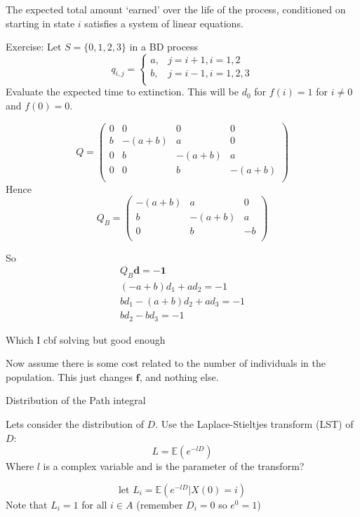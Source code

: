 \documentclass{/home/janmebows/Documents/LatexTemplates/myassignment}
\begin{document}
The expected total amount `earned' over the life of the process, conditioned on starting in state $i$ satisfies a system of linear equations.  


Exercise: Let $S = \{0,1,2,3\}$ in a BD process
\[q_{i,j} = \begin{cases}
a,& j=i+1, i=1,2\\
b,& j=i-1, i=1,2,3\\
\end{cases}\]
Evaluate the expected time to extinction.
This will be $d_0$ for $f(i) = 1$ for $i\neq 0$ and $f(0) = 0$.

\[Q = \begin{pmatrix}
    0&0&0&0\\
    b & -(a+b) & a & 0\\
    0&b & -(a+b) & a\\
    0&0&b & -(a+b)\\
\end{pmatrix}\]
Hence
\[Q_B = \begin{pmatrix}
    -(a+b) & a & 0\\
    b & -(a+b) & a\\
    0&b & -b\\
\end{pmatrix}\]


So
\begin{align*}
    Q_B \mathbf{d} = -\mathbf{1}\\
    (-a+b) d_1 + ad_2 = -1\\
    b d_1 - (a+b) d_2 + ad_3 = -1\\
    bd_2 - bd_3 = -1
\end{align*}

Which I cbf solving but good enough

Now assume there is some cost related to the number of individuals in the population. This just changes $\mathbf{f}$, and nothing else.


Distribution of the Path integral


Lets consider the distribution of $D$. Use the Laplace-Stieltjes transform (LST) of $D$:
\[L = \mathbb{E}\left(e^{-lD}\right)\] 
Where $l$ is a complex variable and is the parameter of the transform?

\[\text{let  } L_i = \mathbb{E}\left(e^{-lD} | X(0) = i\right)\]
Note that $L_i = 1$ for all $i \in A$ (remember $D_i = 0$ so $e^{0} = 1$)
\end{document}
